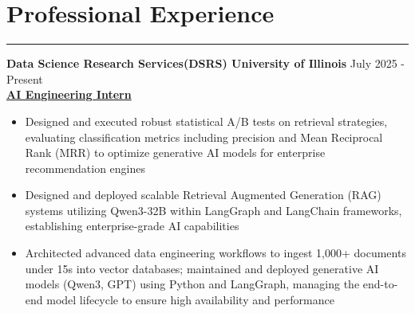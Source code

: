 \documentclass[10pt]{article}
\begin{document}
\noindent
\section*{Professional Experience}
\noindent %
\rule{\textwidth}{0.4pt}
\textbf{Data Science Research Services(DSRS) University of Illinois} \hfill July 2025 - Present \\
\textbf{\underline{AI Engineering Intern}}
\begin{itemize}[left=0pt, itemsep=0pt]
    \item Designed and executed robust statistical A/B tests on retrieval strategies, evaluating classification metrics including precision and Mean Reciprocal Rank (MRR) to optimize generative AI models for enterprise recommendation engines
    \item Designed and deployed scalable Retrieval Augmented Generation (RAG) systems utilizing Qwen3-32B within LangGraph and LangChain frameworks, establishing enterprise-grade AI capabilities
    \item Architected advanced data engineering workflows to ingest 1,000+ documents under 15s into vector databases; maintained and deployed generative AI models (Qwen3, GPT) using Python and LangGraph, managing the end-to-end model lifecycle to ensure high availability and performance
    

\end{itemize}
\end{document}
